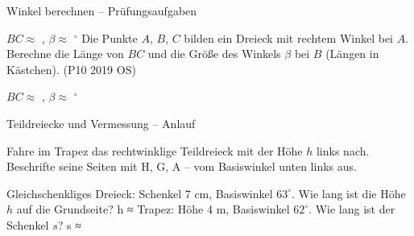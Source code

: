 \begin{aufgabe}{Winkel berechnen – Prüfungsaufgaben}
\begin{teile}
\begin{ksys}[xmin=-2,xmax=4,ymin=-4,ymax=3,ablesen]    \end{ksys}
$BC \approx$ \leerfeld , $\beta \approx$ \leerfeld $^\circ$
\teil Die Punkte $A$, $B$, $C$ bilden ein Dreieck mit rechtem Winkel bei $A$. Berechne die Länge von $BC$ und die Größe des Winkels $\beta$ bei $B$ (Längen in Kästchen). \hfill (P10 2019 OS) \\

\begin{ksys}[xmin=-1,xmax=4,ymin=-6,ymax=3,ablesen]    \end{ksys}
$BC \approx$ \leerfeld , $\beta \approx$ \leerfeld $^\circ$
\end{teile}
\end{aufgabe}

\begin{aufgabe}{Teildreiecke und Vermessung – Anlauf}
\begin{teile}
\teil Fahre im Trapez das rechtwinklige Teildreieck mit der Höhe $h$ links nach. Beschrifte seine Seiten mit H, G, A – vom Basiswinkel unten links aus.

\teil Gleichschenkliges Dreieck: Schenkel $7$ cm, Basiswinkel $63^\circ$. Wie lang ist die Höhe $h$ auf die Grundseite? h ≈ \leerfeld[cm]
\teil Trapez: Höhe $4$ m, Basiswinkel $62^\circ$. Wie lang ist der Schenkel $s$? s ≈ \leerfeld[m]
\end{teile}
\end{aufgabe}

